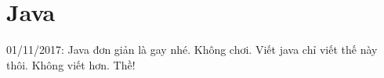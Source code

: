 \chapter{Java}

01/11/2017: Java đơn giản là gay nhé. Không chơi. Viết java chỉ viết thế này thôi. Không viết hơn. Thề!